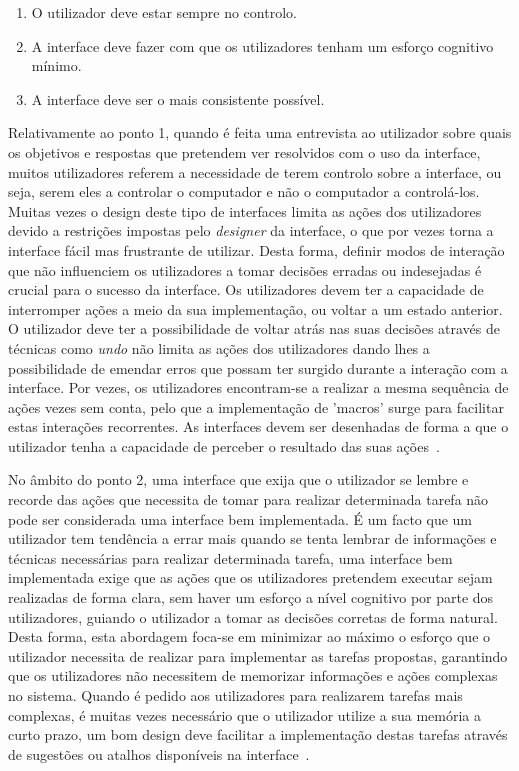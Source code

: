 \begin{enumerate}
  \item O utilizador deve estar sempre no controlo.
  \item A interface deve fazer com que os utilizadores tenham um esforço cognitivo mínimo.
  \item A interface deve ser o mais consistente possível.
\end{enumerate}

Relativamente ao ponto 1, quando é feita uma entrevista ao utilizador sobre quais os objetivos e respostas que pretendem ver resolvidos com o uso da interface, muitos utilizadores referem a necessidade de terem controlo sobre a interface, ou seja, serem eles a controlar o computador e não o computador a controlá-los. Muitas vezes o design deste tipo de interfaces limita as ações dos utilizadores devido a restrições impostas pelo \textit{designer} da interface, o que por vezes torna a interface fácil mas frustrante de utilizar. Desta forma, definir modos de interação que não influenciem os utilizadores a tomar decisões erradas ou indesejadas é crucial para o sucesso da interface. Os utilizadores devem ter a capacidade de interromper ações a meio da sua implementação, ou voltar a um estado anterior. O utilizador deve ter a possibilidade de voltar atrás nas suas decisões através de técnicas como \textit{undo} não limita as ações dos utilizadores dando lhes a possibilidade de emendar erros que possam ter surgido durante a interação com a interface. Por vezes, os utilizadores encontram-se a realizar a mesma sequência de ações vezes sem conta, pelo que a implementação de 'macros' surge para facilitar estas interações recorrentes. As interfaces devem ser desenhadas de forma a que o utilizador tenha a capacidade de perceber o resultado das suas ações~\cite{sridevi2014user}.

No âmbito do ponto 2, uma interface que exija que o utilizador se lembre e recorde das ações que necessita de tomar para realizar determinada tarefa não pode ser considerada uma interface bem implementada. É um facto que um utilizador tem tendência a errar mais quando se tenta lembrar de informações e técnicas necessárias para realizar determinada tarefa, uma interface bem implementada exige que as ações que os utilizadores pretendem executar sejam realizadas de forma clara, sem haver um esforço a nível cognitivo por parte dos utilizadores, guiando o utilizador a tomar as decisões corretas de forma natural. Desta forma, esta abordagem foca-se em minimizar ao máximo o esforço que o utilizador necessita de realizar para implementar as tarefas propostas, garantindo que os utilizadores não necessitem de memorizar informações e ações complexas no sistema. Quando é pedido aos utilizadores para realizarem tarefas mais complexas, é muitas vezes necessário que o utilizador utilize a sua memória a curto prazo, um bom design deve facilitar a implementação destas tarefas através de sugestões ou atalhos disponíveis na interface~\cite{sridevi2014user}.

